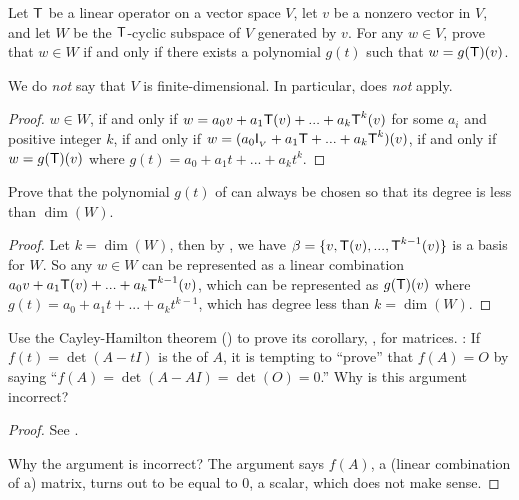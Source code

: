 \begin{exercise} \label{exercise 5.4.13}
Let \(\textsf{T}\) be a linear operator on a vector space \(V\), let \(v\) be a nonzero vector in \(V\), and let \(W\) be the \(\textsf{T}\)-cyclic subspace of \(V\) generated by \(v\).
For any \(w \in V\), prove that \(w \in W\) if and only if there exists a polynomial \(g(t)\) such that \(w = g(\textsf{T})(v)\).
\end{exercise}

\begin{note}
We do \emph{not} say that \(V\) is finite-dimensional.
In particular,  does \emph{not} apply.
\end{note}

\begin{proof}
\(w \in W\), if and only if \(w = a_0 v + a_1 \textsf{T}(v) + ... + a_k \textsf{T}^k(v)\) for some \(a_i\) and positive integer \(k\),
if and only if \(w = (a_0 \textsf{I}_{_V}{} + a_1 \textsf{T} + ... + a_k \textsf{T}^k)(v)\), if and only if \(w = g(\textsf{T})(v)\) where \(g(t) = a_0 + a_1 t + ... + a_k t^k\).
\end{proof}

\begin{exercise} \label{exercise 5.4.14}
Prove that the polynomial \(g(t)\) of  can always be chosen so that its degree is less than \(\dim(W)\).
\end{exercise}

\begin{proof}
Let \(k = \dim(W)\), then by , we have \(\beta = \{ v, \textsf{T}(v), ..., \textsf{T}^{k - 1}(v) \}\) is a basis for \(W\).
So any \(w \in W\) can be represented as a linear combination \(a_0 v + a_1 \textsf{T}(v) + ... + a_k \textsf{T}^{k - 1}(v)\), which can be represented as \(g(\textsf{T})(v)\) where \(g(t) = a_0 + a_1 t + ... + a_k t^{k - 1}\), which has degree less than \(k = \dim(W)\).
\end{proof}

\begin{exercise} \label{exercise 5.4.15}
Use the Cayley-Hamilton theorem () to prove its corollary, , for matrices.
: If \(f(t) = \det(A - tI)\) is the \CPOLY{} of \(A\), it is tempting to ``prove'' that \(f(A) = O\) by saying ``\(f(A) = \det(A - AI) = \det(O) = 0\).''
Why is this argument incorrect?
\end{exercise}

\begin{proof}
See .

Why the argument is incorrect? The argument says \(f(A)\), a (linear combination of a) matrix, turns out to be equal to \(0\), a scalar, which does not make sense.
\end{proof}

